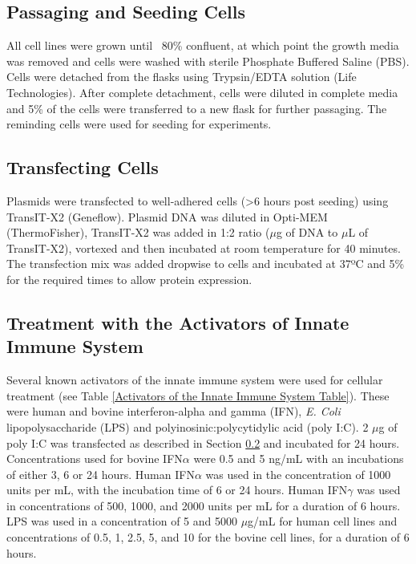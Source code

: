 \subsection{Passaging and Seeding Cells} \label{Passaging and Seeding Cells}
All cell lines were grown until ~80\% confluent, at which point the growth media was removed and cells were washed with sterile Phosphate Buffered Saline (PBS). Cells were detached from the flasks using Trypsin/EDTA solution (Life Technologies). After complete detachment, cells were diluted in complete media and 5\% of the cells were transferred to a new flask for further passaging. The reminding cells were used for seeding for experiments.




\subsection{Transfecting Cells} \label{Transfecting Cells}
Plasmids were transfected to well-adhered cells (>6 hours post seeding) using TransIT-X2 (Geneflow). Plasmid DNA was diluted in Opti-MEM (ThermoFisher), TransIT-X2 was added in 1:2 ratio (\(\mu\)g of DNA to \(\mu\)L of TransIT-X2), vortexed and then incubated at room temperature for 40 minutes. The transfection mix was added dropwise to cells and incubated at 37ºC and 5\%  for the required times to allow protein expression.




\subsection{Treatment with the Activators of Innate Immune System} \label{Treatment with the Activators of Innate Immune System}
Several known activators of the innate immune system were used for cellular treatment (see Table \ref{Activators of the Innate Immune System Table}). These were human and bovine interferon-alpha and gamma (IFN), \textit{E. Coli} lipopolysaccharide (LPS) and polyinosinic:polycytidylic acid (poly I:C). 2 \(\mu\)g of poly I:C was transfected as described in Section \ref{Transfecting Cells} and incubated for 24 hours. Concentrations used for bovine IFN\(\alpha\) were 0.5 and 5 ng/mL with an incubations of either 3, 6 or 24 hours. Human IFN\(\alpha\) was used in the concentration of 1000 units per mL, with the incubation time of 6 or 24 hours. Human IFN\(\gamma\) was used in concentrations of 500, 1000, and 2000 units per mL for a duration of 6 hours. LPS was used in a concentration of 5 and 5000 \(\mu\)g/mL for human cell lines and concentrations of 0.5, 1, 2.5, 5, and 10 for the bovine cell lines, for a duration of 6 hours.
 
